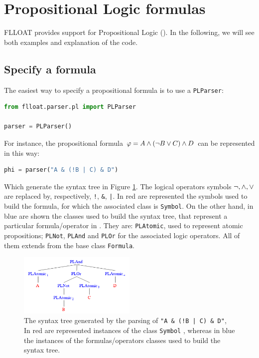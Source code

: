 \section{Propositional Logic formulas}\label{sect:flloat-pl}

FLLOAT provides support for Propositional Logic (\PL). In the following, we will see both examples and explanation of the code.

\subsection{Specify a \PL formula}\label{sect:flloat-pl-syntax}
The easiest way to specify a propositional formula is to use a \texttt{PLParser}:

\begin{lstlisting}[language=Python, style=Python]
from flloat.parser.pl import PLParser

parser = PLParser()
\end{lstlisting}
For instance, the propositional formula $\varphi= A \wedge (\lnot B \vee C) \wedge D$ can be represented in this way:

\begin{lstlisting}[language=Python, style=Python]
phi = parser("A & (!B | C) & D")
\end{lstlisting}
Which generate the syntax tree in Figure \ref{fig:pl-formula-example-1-syntax-tree}. The logical operators symbols $\lnot, \wedge, \vee$ are replaced by, respectively, \texttt{!}, \texttt{\&}, \texttt{|}. In red are represented the symbols used to build the formula, for which the associated class is \texttt{Symbol}. On the other hand, in blue are shown the classes used to build the syntax tree, that represent a particular formula/operator in \PL. They are: \texttt{PLAtomic}, used to represent atomic propositions; \texttt{PLNot}, \texttt{PLAnd} and \texttt{PLOr} for the associated logic operators. All of them extends from the base class \texttt{Formula}.


\begin{figure}[h]
	\centering
	\includegraphics[width=0.5\textwidth]{images/pl-formula-example-1-syntax-tree}
	\caption{The syntax tree generated by the parsing of \texttt{"A \& (!B | C) \& D"}, In red are represented instances of the class \texttt{Symbol} , whereas in blue the instances of the formulas/operators classes used to build the syntax tree.}
	\label{fig:pl-formula-example-1-syntax-tree}
	
\end{figure}

